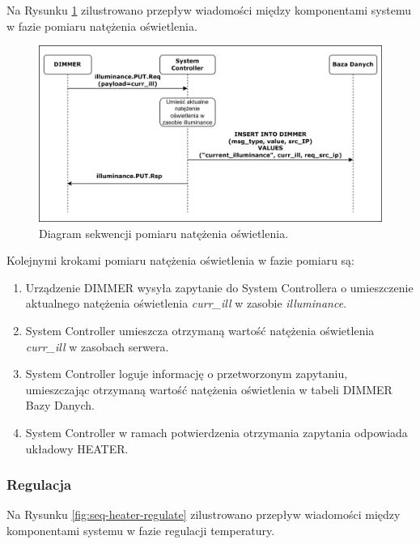             Na Rysunku \ref{fig:seq-dimmer-measure} zilustrowano przepływ wiadomości między komponentami systemu w fazie pomiaru natężenia oświetlenia.

            \begin{figure}[H]
                \centering
                \includegraphics[width=0.8\linewidth]{graphics/sequence-diagrams/dimmer-measure-seq.png}
                \caption{Diagram sekwencji pomiaru natężenia oświetlenia.}
                \label{fig:seq-dimmer-measure}
            \end{figure}

            Kolejnymi krokami pomiaru natężenia oświetlenia w fazie pomiaru są:
            \begin{enumerate}
                \item Urządzenie DIMMER wysyła zapytanie do System Controllera o umieszczenie aktualnego natężenia oświetlenia \textit{curr\_ill} w zasobie \textit{illuminance}.
                \item System Controller umieszcza otrzymaną wartość natężenia oświetlenia \textit{curr\_ill} w zasobach serwera.
                \item System Controller loguje informację o przetworzonym zapytaniu, umieszczając otrzymaną wartość natężenia oświetlenia w tabeli DIMMER Bazy Danych.
                \item System Controller w ramach potwierdzenia otrzymania zapytania odpowiada układowy HEATER.
            \end{enumerate}


        \subsubsection{Regulacja}

            Na Rysunku \ref{fig:seq-heater-regulate} zilustrowano przepływ wiadomości między komponentami systemu w fazie regulacji temperatury.

